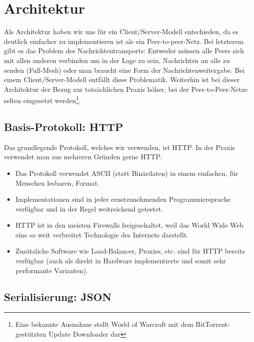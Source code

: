 \documentclass[12pt, a4paper]{scrartcl}
\begin{document}
\pagestyle{fancy}
\lhead{}
\newcommand{\np}{\bigskip\noindent}

\setlength{\parindent}{0pt}

\section{Architektur}

Als Architektur haben wir uns für ein Client/Server-Modell entschieden, da es
deutlich einfacher zu implementieren ist als ein Peer-to-peer-Netz. Bei
letzterem gibt es das Problem des Nachrichtentransports: Entweder müssen alle
Peers sich mit allen anderen verbinden um in der Lage zu sein, Nachrichten an
alle zu senden (Full-Mesh) oder man braucht eine Form der
Nachrichtenweitergabe. Bei einem Client/Server-Modell entfällt diese
Problematik. Weiterhin ist bei dieser Architektur der Bezug zur tatsächlichen
Praxis höher, bei der Peer-to-Peer-Netze selten eingesetzt werden\footnote{Eine
bekannte Ausnahme stellt World of Warcraft mit dem BitTorrent-gestützten Update
Downloader dar}.

\subsection{Basis-Protokoll: HTTP}

Das grundlegende Protokoll, welches wir verwenden, ist HTTP. In der Praxis
verwendet man aus mehreren Gründen gerne HTTP:
\begin{itemize}
	\item Das Protokoll verwendet ASCII (statt Binärdaten) in einem
	einfachen, für Menschen lesbaren, Format.

	\item Implementationen sind in jeder ernstzunehmenden
	Programmiersprache ver\-füg\-bar und in der Regel weitreichend getestet.

	\item HTTP ist in den meisten Firewalls freigeschaltet, weil das World
	Wide Web eine so weit verbreitet Technologie des Internets darstellt.

	\item Zusätzliche Software wie Load-Balancer, Proxies, etc. sind für
	HTTP bereits verfügbar (auch als direkt in Hardware implementierte und
	somit sehr performante Varianten).
\end{itemize}

\subsection{Serialisierung: JSON}
\end{document}
